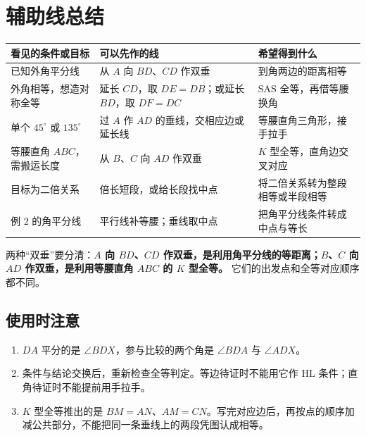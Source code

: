\ifteachernotes
\clearpage
\section{\texorpdfstring{辅助线总结}{辅助线总结}}

\begin{center}
\small
\begin{tabularx}{\linewidth}{LLL}
\toprule
看见的条件或目标 & 可以先作的线 & 希望得到什么 \\
\midrule
已知外角平分线 & 从 $A$ 向 $BD$、$CD$ 作双垂 & 到角两边的距离相等 \\
外角相等，想造对称全等 & 延长 $CD$，取 $DE=DB$；或延长 $BD$，取 $DF=DC$ & $\mathrm{SAS}$ 全等，再借等腰换角 \\
单个 $45^\circ$ 或 $135^\circ$ & 过 $A$ 作 $AD$ 的垂线，交相应边或延长线 & 等腰直角三角形，接手拉手 \\
等腰直角 $ABC$，需搬运长度 & 从 $B$、$C$ 向 $AD$ 作双垂 & $K$ 型全等，直角边交叉对应 \\
目标为二倍关系 & 倍长短段，或给长段找中点 & 将二倍关系转为整段相等或半段相等 \\
例 $2$ 的角平分线 & 平行线补等腰；垂线取中点 & 把角平分线条件转成中点与等长 \\
\bottomrule
\end{tabularx}
\end{center}

两种“双垂”要分清：\textbf{$A$ 向 $BD$、$CD$ 作双垂，是利用角平分线的等距离；$B$、$C$ 向 $AD$ 作双垂，是利用等腰直角 $ABC$ 的 $K$ 型全等。} 它们的出发点和全等对应顺序都不同。

\subsection{\texorpdfstring{使用时注意}{使用时注意}}

\begin{enumerate}
\item $DA$ 平分的是 $\angle BDX$，参与比较的两个角是 $\angle BDA$ 与 $\angle ADX$。
\item 条件与结论交换后，重新检查全等判定。等边待证时不能用它作 $\mathrm{HL}$ 条件；直角待证时不能提前用手拉手。
\item $K$ 型全等推出的是 $BM=AN$、$AM=CN$。写完对应边后，再按点的顺序加减公共部分，不能把同一条垂线上的两段凭图认成相等。
\end{enumerate}
\fi
